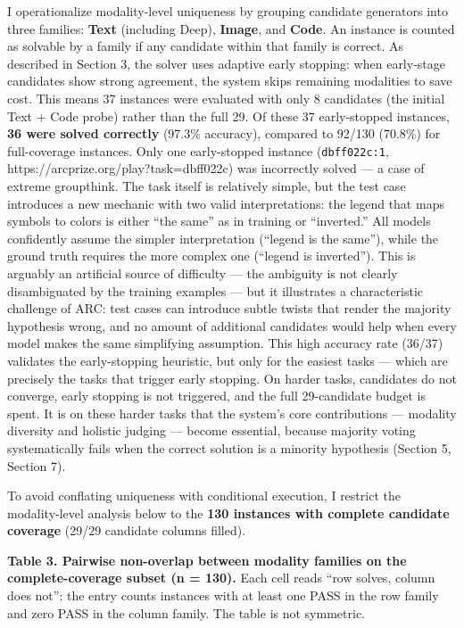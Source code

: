 \documentclass[11pt]{article}
\begin{document}
I operationalize modality-level uniqueness by grouping candidate
generators into three families: \textbf{Text} (including Deep),
\textbf{Image}, and \textbf{Code}. An instance is counted as solvable by
a family if any candidate within that family is correct. As described in
Section 3, the solver uses adaptive early stopping: when early-stage
candidates show strong agreement, the system skips remaining modalities
to save cost. This means 37 instances were evaluated with only 8
candidates (the initial Text + Code probe) rather than the full 29. Of
these 37 early-stopped instances, \textbf{36 were solved correctly}
(97.3\% accuracy), compared to 92/130 (70.8\%) for full-coverage
instances. Only one early-stopped instance (\texttt{dbff022c:1},
https://arcprize.org/play?task=dbff022c) was incorrectly solved --- a
case of extreme groupthink. The task itself is relatively simple, but
the test case introduces a new mechanic with two valid interpretations:
the legend that maps symbols to colors is either ``the same'' as in
training or ``inverted.'' All models confidently assume the simpler
interpretation (``legend is the same''), while the ground truth requires
the more complex one (``legend is inverted''). This is arguably an
artificial source of difficulty --- the ambiguity is not clearly
disambiguated by the training examples --- but it illustrates a
characteristic challenge of ARC: test cases can introduce subtle twists
that render the majority hypothesis wrong, and no amount of additional
candidates would help when every model makes the same simplifying
assumption. This high accuracy rate (36/37) validates the early-stopping
heuristic, but only for the easiest tasks --- which are precisely the
tasks that trigger early stopping. On harder tasks, candidates do not
converge, early stopping is not triggered, and the full 29-candidate
budget is spent. It is on these harder tasks that the system's core
contributions --- modality diversity and holistic judging --- become
essential, because majority voting systematically fails when the correct
solution is a minority hypothesis (Section 5, Section 7).

To avoid conflating uniqueness with conditional execution, I restrict
the modality-level analysis below to the \textbf{130 instances with
complete candidate coverage} (29/29 candidate columns filled).

\textbf{Table 3. Pairwise non-overlap between modality families on the
complete-coverage subset (n = 130).} Each cell reads ``row solves,
column does not'': the entry counts instances with at least one PASS in
the row family and zero PASS in the column family. The table is not
symmetric.
\end{document}
